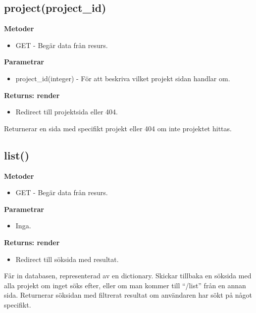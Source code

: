 \documentclass{TDP003mall}
\begin{document}
\subsection{project(project\_id)}
\textbf{Metoder}
\begin{itemize}
    \item GET - Begär data från resurs.
\end{itemize}
\textbf{Parametrar}
\begin{itemize}
    \item project\_id(integer) - För att beskriva vilket projekt sidan handlar om.
\end{itemize}
\textbf{Returns: render}
\begin{itemize}
    \item[] Redirect till projektsida eller 404.
\end{itemize}
Returnerar en sida med specifikt projekt eller 404 om inte projektet hittas.
\newpage
\subsection{list()}
\textbf{Metoder}
\begin{itemize}
    \item GET - Begär data från resurs.
\end{itemize}
\textbf{Parametrar}
\begin{itemize}
    \item Inga.
\end{itemize}
\textbf{Returns: render}
\begin{itemize}
    \item[] Redirect till söksida med resultat.
\end{itemize}
Får in databasen, representerad av en dictionary. Skickar tillbaka en söksida med alla projekt om inget söks efter, eller om man kommer till ``/list'' från en annan sida. Returnerar söksidan med filtrerat resultat om användaren har sökt på något specifikt.
\end{document}
